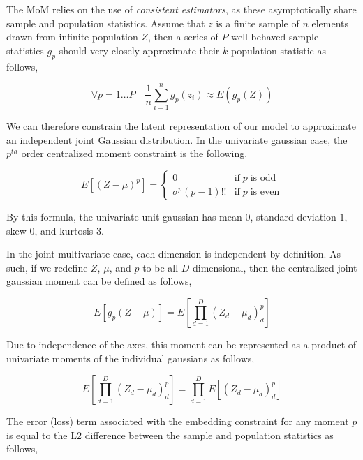 \documentclass[10pt,twocolumn,letterpaper]{article}
\begin{document}
The MoM relies on the use of \textit{consistent estimators}, as these asymptotically share sample and population statistics.
Assume that $z$ is a finite sample of $n$ elements drawn from infinite population $Z$, then a series of $P$ well-behaved sample statistics $g_p$ should very closely approximate their $k$ population statistic as follows,

\begin{equation}
	\forall p=1 \dots P \quad
	\frac{1}{n} \sum_{i=1}^n g_p(z_i) \approx E(g_p(Z))
\end{equation}

We can therefore constrain the latent representation of our model to approximate an independent joint Gaussian distribution. 
In the univariate gaussian case, the $p^{th}$ order centralized moment constraint is the following.

\begin{equation}
	E\left[ (Z-\mu)^p \right] = 
	\begin{cases} 
		0 &  \text{if} \; p \; \text{is odd} \\
		\sigma^p(p - 1)!! & \text{if} \; p \; \text{is even}
	\end{cases}
\end{equation}

By this formula, the univariate unit gaussian has mean $0$, standard deviation $1$, skew $0$, and kurtosis 3.

In the joint multivariate case, each dimension is independent by definition.  As such, if we redefine $Z$, $\mu$, and $p$ to be all $D$ dimensional, then the centralized joint gaussian moment can be defined as follows,

\begin{equation}
	E\left[g_p(Z - \mu)\right] = E\left[ \prod_{d=1}^D (Z_d - \mu_d)^p_d \right]
\end{equation}

Due to independence of the axes, this moment can be represented as a product of univariate moments of the individual gaussians as follows,

\begin{equation}
	E\left[ \prod_{d=1}^D (Z_d - \mu_d)^p_d \right] = \prod_{d=1}^D E\left[ (Z_d - \mu_d)^p_d \right]
\end{equation}

The error (loss) term associated with the embedding constraint for any moment $p$ is equal to the L2 difference between the sample and population statistics as follows,
\end{document}
